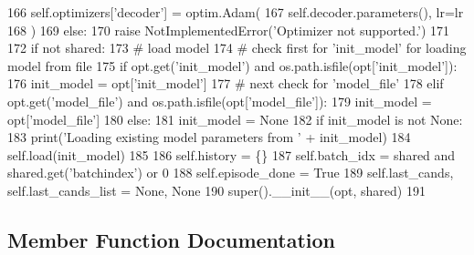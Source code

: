 \begin{DoxyCode}
166                     self.optimizers[\textcolor{stringliteral}{'decoder'}] = optim.Adam(
167                         self.decoder.parameters(), lr=lr
168                     )
169             \textcolor{keywordflow}{else}:
170                 \textcolor{keywordflow}{raise} NotImplementedError(\textcolor{stringliteral}{'Optimizer not supported.'})
171 
172         \textcolor{keywordflow}{if} \textcolor{keywordflow}{not} shared:
173             \textcolor{comment}{# load model}
174             \textcolor{comment}{# check first for 'init\_model' for loading model from file}
175             \textcolor{keywordflow}{if} opt.get(\textcolor{stringliteral}{'init\_model'}) \textcolor{keywordflow}{and} os.path.isfile(opt[\textcolor{stringliteral}{'init\_model'}]):
176                 init\_model = opt[\textcolor{stringliteral}{'init\_model'}]
177             \textcolor{comment}{# next check for 'model\_file'}
178             \textcolor{keywordflow}{elif} opt.get(\textcolor{stringliteral}{'model\_file'}) \textcolor{keywordflow}{and} os.path.isfile(opt[\textcolor{stringliteral}{'model\_file'}]):
179                 init\_model = opt[\textcolor{stringliteral}{'model\_file'}]
180             \textcolor{keywordflow}{else}:
181                 init\_model = \textcolor{keywordtype}{None}
182             \textcolor{keywordflow}{if} init\_model \textcolor{keywordflow}{is} \textcolor{keywordflow}{not} \textcolor{keywordtype}{None}:
183                 print(\textcolor{stringliteral}{'Loading existing model parameters from '} + init\_model)
184                 self.load(init\_model)
185 
186         self.history = \{\}
187         self.batch\_idx = shared \textcolor{keywordflow}{and} shared.get(\textcolor{stringliteral}{'batchindex'}) \textcolor{keywordflow}{or} 0
188         self.episode\_done = \textcolor{keyword}{True}
189         self.last\_cands, self.last\_cands\_list = \textcolor{keywordtype}{None}, \textcolor{keywordtype}{None}
190         super().\_\_init\_\_(opt, shared)
191 
\end{DoxyCode}


\subsection{Member Function Documentation}
\mbox{\label{classparlai_1_1agents_1_1legacy__agents_1_1memnn_1_1memnn__v0_1_1MemnnAgent_a7079216ce7367ba0ca3ac205daa516c4}} 

